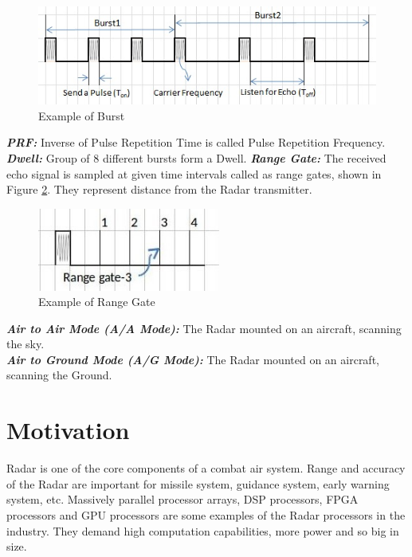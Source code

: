 \begin{figure}[h!]
	\centering
	\includegraphics[]{figures/prf}
	\caption{Example of Burst}
	\label{fig:intro:radar:prf}
\end{figure}
\vspace*{0.2cm}
\noindent
\textsl{\textbf{PRF:}} Inverse of Pulse Repetition Time is called Pulse Repetition Frequency. \\
\noindent
\textsl{\textbf{Dwell:}} Group of 8 different bursts form a Dwell.
\FloatBarrier
\noindent
\textsl{\textbf{Range Gate:}} The received  echo signal is sampled at given time intervals called as range gates, shown in Figure \ref{fig:intro:radar:rg}. They represent distance from the Radar transmitter.

\begin{figure}[h!]
	\centering
	\includegraphics[width=60mm]{figures/range_gate}
	\caption{Example of Range Gate}
	\label{fig:intro:radar:rg}
\end{figure}
\noindent
\textsl{\textbf{Air to Air Mode (A/A Mode):}} The Radar mounted on an aircraft, scanning the sky.\\
\noindent
\textsl{\textbf{Air to Ground Mode (A/G Mode):}} The Radar mounted on an aircraft, scanning the Ground.
\section{Motivation}
\label{sec:intro:motivation}
Radar is one of the core components of a combat air system. Range and accuracy of the Radar are important for missile system, guidance system, early warning system, etc. Massively parallel processor arrays, DSP processors, FPGA processors and GPU processors\cite{HalmSwe} are some examples of the Radar processors in the industry.  They demand high computation capabilities, more power and so big in size.


